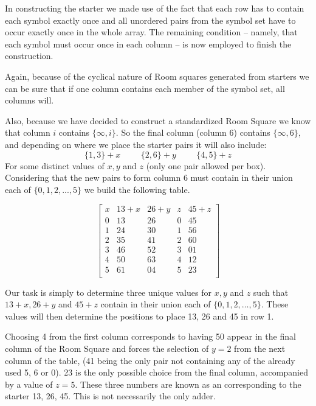 In constructing the starter we made use of the fact that each row has to contain each symbol exactly once and all unordered pairs from the symbol set have to occur exactly once in the whole array.
The remaining condition – namely, that each symbol must occur once in each column – is now employed to finish the construction.

Again, because of the cyclical nature of Room squares generated from starters we can be sure that if one column contains each member of the symbol set, all columns will.

Also, because we have decided to construct a standardized Room Square we know that column $i$ contains $\{\infty,i\}$.
So the final column (column 6) contains $\{\infty,6\}$, and depending on where we place the starter pairs it will also include:
\begin{equation*}
\{1,3\} + x \hspace{1cm} \{2,6\} + y \hspace{1cm}\{4,5\} + z
\end{equation*}
For some distinct values of $x,y$ and $z$ (only one pair allowed per box).
Considering that the new pairs to form column 6 must contain in their union each of
$\{0,1,2,...,5\}$
we build the following table.

\begin{equation}
  \begin{bmatrix}
    x &  13 + x & 26 + y & z & 45 + z \\
    0 &    13   &   26   & 0 &   45   \\
    1 &    24   &   30   & 1 &   56   \\
    2 &    35   &   41   & 2 &   60   \\
    3 &    46   &   52   & 3 &   01   \\
    4 &    50   &   63   & 4 &   12   \\
    5 &    61   &   04   & 5 &   23   \\
  \end{bmatrix}
  \label{eq:adder}
\end{equation}

Our task is simply to determine three unique values for $x, y$ and $z$ such that $13 + x, 26 + y$ and $45 + z$ contain in their union each of $\{0, 1, 2, \ldots, 5\}$.
These values will then determine the positions to place 13, 26 and 45 in row 1.

Choosing 4 from the first column corresponds to having 50 appear in the final column of the Room Square and forces the selection of $y = 2$ from the next column of the table, (41 being the only pair not containing any of the already used 5, 6 or 0).
23 is the only possible choice from the final column, accompanied by a value of $z = 5$.
These three numbers are known as an  corresponding to the starter 13, 26, 45.
This is not necessarily the only adder.

